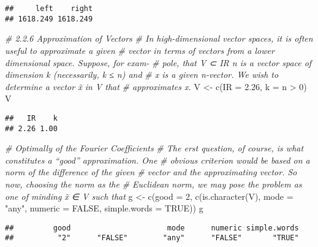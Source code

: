 \documentclass[
]{article}
\newenvironment{Shaded}{\begin{snugshade}}{\end{snugshade}}
\newcommand{\AttributeTok}[1]{\textcolor[rgb]{0.77,0.63,0.00}{#1}}
\newcommand{\CommentTok}[1]{\textcolor[rgb]{0.56,0.35,0.01}{\textit{#1}}}
\newcommand{\ConstantTok}[1]{\textcolor[rgb]{0.00,0.00,0.00}{#1}}
\newcommand{\DecValTok}[1]{\textcolor[rgb]{0.00,0.00,0.81}{#1}}
\newcommand{\FloatTok}[1]{\textcolor[rgb]{0.00,0.00,0.81}{#1}}
\newcommand{\FunctionTok}[1]{\textcolor[rgb]{0.00,0.00,0.00}{#1}}
\newcommand{\NormalTok}[1]{#1}
\newcommand{\OtherTok}[1]{\textcolor[rgb]{0.56,0.35,0.01}{#1}}
\newcommand{\SpecialCharTok}[1]{\textcolor[rgb]{0.00,0.00,0.00}{#1}}
\newcommand{\StringTok}[1]{\textcolor[rgb]{0.31,0.60,0.02}{#1}}
\begin{document}
\begin{verbatim}
##     left    right 
## 1618.249 1618.249
\end{verbatim}

\begin{Shaded}
\begin{Highlighting}[]
\CommentTok{\# 2.2.6 Approximation of Vectors}
\CommentTok{\# In high{-}dimensional vector spaces, it is often useful to approximate a given}
\CommentTok{\# vector in terms of vectors from a lower dimensional space. Suppose, for exam{-}}
\CommentTok{\# pole, that V ⊂ IR n is a vector space of dimension k (necessarily, k ≤ n) and }
\CommentTok{\# x is a given n{-}vector. We wish to determine a vector x̃ in V that}
\CommentTok{\# approximates x.}
\NormalTok{V }\OtherTok{\textless{}{-}} \FunctionTok{c}\NormalTok{(}\AttributeTok{IR =} \FloatTok{2.26}\NormalTok{, }\AttributeTok{k =}\NormalTok{ n }\SpecialCharTok{\textgreater{}} \DecValTok{0}\NormalTok{)}
\NormalTok{V}
\end{Highlighting}
\end{Shaded}

\begin{verbatim}
##   IR    k 
## 2.26 1.00
\end{verbatim}

\begin{Shaded}
\begin{Highlighting}[]
\CommentTok{\# Optimally of the Fourier Coeﬃcients}
\CommentTok{\# The erst question, of course, is what constitutes a “good” approximation. One}
\CommentTok{\# obvious criterion would be based on a norm of the difference of the given }
\CommentTok{\# vector and the approximating vector. So now, choosing the norm as the }
\CommentTok{\# Euclidean norm, we may pose the problem as one of minding x̃ ∈ V such that}
\NormalTok{g }\OtherTok{\textless{}{-}} \FunctionTok{c}\NormalTok{(}\AttributeTok{good =} \DecValTok{2}\NormalTok{, }\FunctionTok{c}\NormalTok{(}\FunctionTok{is.character}\NormalTok{(V), }\AttributeTok{mode =} \StringTok{"any"}\NormalTok{, }\AttributeTok{numeric =} \ConstantTok{FALSE}\NormalTok{, }
                      \AttributeTok{simple.words =} \ConstantTok{TRUE}\NormalTok{))}
\NormalTok{g}
\end{Highlighting}
\end{Shaded}

\begin{verbatim}
##         good                      mode      numeric simple.words 
##          "2"      "FALSE"        "any"      "FALSE"       "TRUE"
\end{verbatim}
\end{document}
